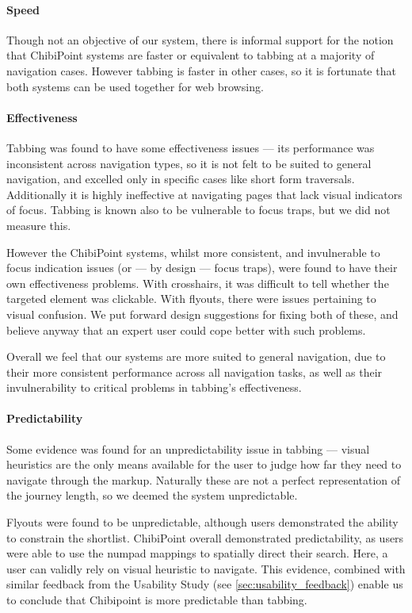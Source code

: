\documentclass[a4paper, 12pt]{report}
\begin{document}
\paragraph{Speed}
Though not an objective of our system, there is informal support for the notion that ChibiPoint systems are faster or equivalent to tabbing at a majority of navigation cases. However tabbing is faster in other cases, so it is fortunate that both systems can be used together for web browsing.

\paragraph{Effectiveness}
Tabbing was found to have some effectiveness issues --- its performance was inconsistent across navigation types, so it is not felt to be suited to general navigation, and excelled only in specific cases like short form traversals. Additionally it is highly ineffective at navigating pages that lack visual indicators of focus. Tabbing is known also to be vulnerable to focus traps, but we did not measure this.

However the ChibiPoint systems, whilst more consistent, and invulnerable to focus indication issues (or --- by design --- focus traps), were found to have their own effectiveness problems. With crosshairs, it was difficult to tell whether the targeted element was clickable. With flyouts, there were issues pertaining to visual confusion. We put forward design suggestions for fixing both of these, and believe anyway that an expert user could cope better with such problems.

Overall we feel that our systems are more suited to general navigation, due to their more consistent performance across all navigation tasks, as well as their invulnerability to critical problems in tabbing's effectiveness.

\paragraph{Predictability}
Some evidence was found for an unpredictability issue in tabbing --- visual heuristics are the only means available for the user to judge how far they need to navigate through the markup. Naturally these are not a perfect representation of the journey length, so we deemed the system unpredictable.

Flyouts were found to be unpredictable, although users demonstrated the ability to constrain the shortlist. ChibiPoint overall demonstrated predictability, as users were able to use the numpad mappings to spatially direct their search. Here, a user can validly rely on visual heuristic to navigate. This evidence, combined with similar feedback from the Usability Study (see \cref{sec:usability_feedback}) enable us to conclude that Chibipoint is more predictable than tabbing.
\end{document}
